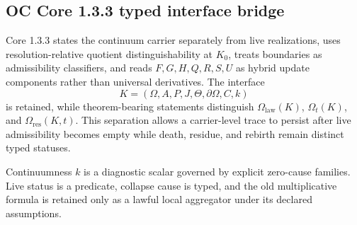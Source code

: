 
\subsection{OC Core 1.3.3 typed interface bridge}
\label{sec:oc133-collapse-scientific-closure-bridge}

Core 1.3.3 states the continuum carrier separately from live realizations,
uses resolution-relative quotient distinguishability at \(K_0\), treats
boundaries as admissibility classifiers, and reads \(F,G,H,Q,R,S,U\) as
hybrid update components rather than universal derivatives.  The interface
\[
K=(\Omega,A,P,J,\Theta,\partial\Omega,C,k)
\]
is retained, while theorem-bearing statements distinguish
\(\Omega_{\mathrm{law}}(K)\), \(\Omega_t(K)\), and
\(\Omega_{\mathrm{res}}(K,t)\).  This separation allows a carrier-level trace
to persist after live admissibility becomes empty while death, residue, and
rebirth remain distinct typed statuses.

Continuumness \(k\) is a diagnostic scalar governed by explicit zero-cause
families.  Live status is a predicate, collapse cause is typed, and the old
multiplicative formula is retained only as a lawful local aggregator under its
declared assumptions.
